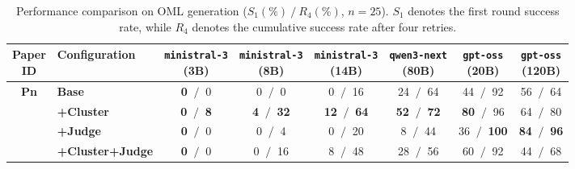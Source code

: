 \begin{table}[htbp]
    \centering
    \small
    \setlength{\tabcolsep}{4pt}
    \caption{Performance comparison on OML generation ($S_1(\%)~/~R_4(\%)$, $n=25$). $S_1$ denotes the first round success rate, while $R_4$ denotes the cumulative success rate after four retries.}
    \begin{tabular}{c|l|cccccc}
        \hline
        \makecell{\textbf{Paper} \\ \textbf{ID}} & \textbf{Configuration} & \makecell{\texttt{ministral-3} \\ (3B)} & \makecell{\texttt{ministral-3} \\ (8B)} & \makecell{\texttt{ministral-3} \\ (14B)} & \makecell{\texttt{qwen3-next} \\ (80B)} & \makecell{\texttt{gpt-oss} \\ (20B)} & \makecell{\texttt{gpt-oss} \\ (120B)} \\
        \hline
        
        \multirow{4}{*}{\textbf{Pn}} 
          & \textbf{Base}& \textbf{0} $~/~$ 0 & 0 $~/~$ 0 & 0 $~/~$ 16 & 24 $~/~$ 64 & 44 $~/~$ 92 & 56 $~/~$ 64 \\
          & \textbf{+Cluster}& \textbf{0} $~/~$ \textbf{8} & \textbf{4} $~/~$ \textbf{32} & \textbf{12} $~/~$ \textbf{64} & \textbf{52} $~/~$ \textbf{72} & \textbf{80} $~/~$ 96 & 64 $~/~$ 80 \\
          & \textbf{+Judge}& \textbf{0} $~/~$ 0 & 0 $~/~$ 4 & 0 $~/~$ 20 & 8 $~/~$ 44 & 36 $~/~$ \textbf{100} & \textbf{84} $~/~$ \textbf{96} \\
          & \textbf{+Cluster+Judge}& \textbf{0} $~/~$ 0 & 0 $~/~$ 16 & 8 $~/~$ 48 & 28 $~/~$ 56 & 60 $~/~$ 92 & 44 $~/~$ 68 \\
        \hline
        
    \end{tabular}
    \label{tab:success_rates_pn}
\end{table}